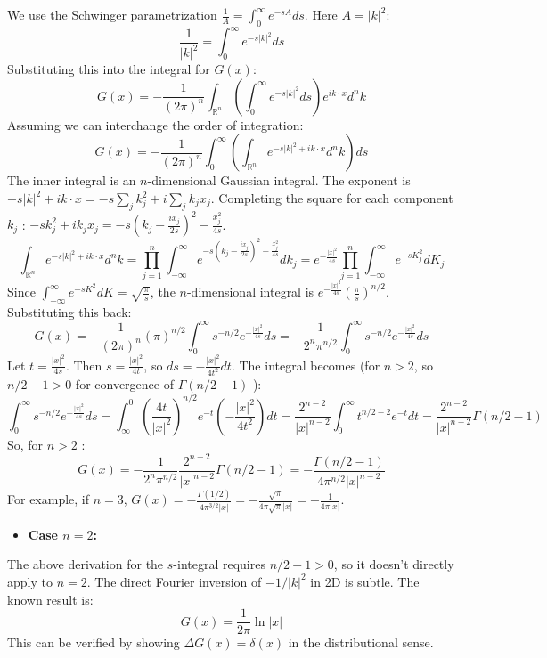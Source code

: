 We use the Schwinger parametrization $\frac{1}{A}=\int_0^\infty e^{-s A} d s$. Here $A=|k|^2$:
\[
\frac{1}{|k|^2}=\int_0^\infty e^{-s|k|^2} d s
\]
Substituting this into the integral for $G(x)$:
\[
G(x)=-\frac{1}{(2 \pi)^n} \int_{\mathbb{R}^n}\left(\int_0^\infty e^{-s|k|^2} d s\right) e^{i k \cdot x} d^n k
\]
Assuming we can interchange the order of integration:
\[
G(x)=-\frac{1}{(2 \pi)^n} \int_0^\infty\left(\int_{\mathbb{R}^n} e^{-s|k|^2+i k \cdot x} d^n k\right) d s
\]
The inner integral is an $n$-dimensional Gaussian integral. The exponent is $-s|k|^2+i k \cdot x=-s \sum_j k_j^2+i \sum_j k_j x_j$.
Completing the square for each component $k_j$ : $-s k_j^2+i k_j x_j=-s\left(k_j-\frac{i x_j}{2 s}\right)^2-\frac{x_j^2}{4 s}$.
\[
\int_{\mathbb{R}^n} e^{-s|k|^2+i k \cdot x} d^n k=\prod_{j=1}^n \int_{-\infty}^\infty e^{-s\left(k_j-\frac{i x_j}{2 s}\right)^2-\frac{x_j^2}{4 s}} d k_j=e^{-\frac{|x|^2}{4 s}} \prod_{j=1}^n \int_{-\infty}^\infty e^{-s K_j^2} d K_j
\]
Since $\int_{-\infty}^\infty e^{-s K^2} d K=\sqrt{\frac{\pi}{s}}$, the $n$-dimensional integral is $e^{-\frac{|x|^2}{4 s}}\left(\frac{\pi}{s}\right)^{n / 2}$.
Substituting this back:
\[
G(x)=-\frac{1}{(2 \pi)^n}(\pi)^{n / 2} \int_0^\infty s^{-n / 2} e^{-\frac{|x|^2}{4 s}} d s=-\frac{1}{2^n \pi^{n / 2}} \int_0^\infty s^{-n / 2} e^{-\frac{|x|^2}{4 s}} d s
\]
Let $t=\frac{|x|^2}{4 s}$. Then $s=\frac{|x|^2}{4 t}$, so $d s=-\frac{|x|^2}{4 t^2} d t$.
The integral becomes (for $n>2$, so $n / 2-1>0$ for convergence of $\Gamma(n / 2-1)$ ):
\[
\int_0^\infty s^{-n / 2} e^{-\frac{|x|^2}{4 s}} d s=\int_\infty^0\left(\frac{4 t}{|x|^2}\right)^{n / 2} e^{-t}\left(-\frac{|x|^2}{4 t^2}\right) d t=\frac{2^{n-2}}{|x|^{n-2}} \int_0^\infty t^{n / 2-2} e^{-t} d t=\frac{2^{n-2}}{|x|^{n-2}} \Gamma(n / 2-1)
\]
So, for $n>2$ :
\[
G(x)=-\frac{1}{2^n \pi^{n / 2}} \frac{2^{n-2}}{|x|^{n-2}} \Gamma(n / 2-1)=-\frac{\Gamma(n / 2-1)}{4 \pi^{n / 2}|x|^{n-2}}
\]
For example, if $n=3$, $G(x)=-\frac{\Gamma(1 / 2)}{4 \pi^{3 / 2}|x|}=-\frac{\sqrt{\pi}}{4 \pi \sqrt{\pi}|x|}=-\frac{1}{4 \pi|x|}$.

\begin{itemize}
	\item \textbf{Case $n=2$:}
\end{itemize}

The above derivation for the $s$-integral requires $n / 2-1>0$, so it doesn't directly apply to $n=2$. The direct Fourier inversion of $-1 /|k|^2$ in 2D is subtle. The known result is:
\[
G(x)=\frac{1}{2 \pi} \ln |x|
\]
This can be verified by showing $\Delta G(x)=\delta(x)$ in the distributional sense.


